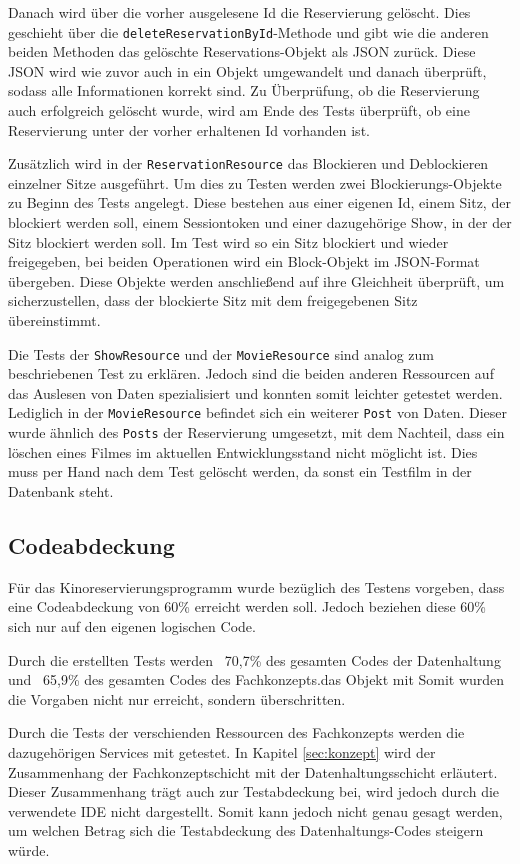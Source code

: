 Danach wird über die vorher ausgelesene Id die Reservierung gelöscht. Dies geschieht über die \texttt{deleteReservationById}-Methode und gibt wie die anderen beiden Methoden das gelöschte Reservations-Objekt als \acs{JSON} zurück.
Diese \acs{JSON} wird wie zuvor auch in ein Objekt umgewandelt und danach überprüft, sodass alle Informationen korrekt sind. 
Zu Überprüfung, ob die Reservierung auch erfolgreich gelöscht wurde, wird am Ende des Tests überprüft, ob eine Reservierung unter der vorher erhaltenen Id vorhanden ist. 

Zusätzlich wird in der \texttt{ReservationResource} das Blockieren und Deblockieren einzelner Sitze ausgeführt. Um dies zu Testen werden zwei Blockierungs-Objekte zu Beginn des Tests angelegt.
Diese bestehen aus einer eigenen Id, einem Sitz, der blockiert werden soll, einem Sessiontoken und einer dazugehörige Show, in der der Sitz blockiert werden soll. 
Im Test wird so ein Sitz blockiert und wieder freigegeben, bei beiden Operationen wird ein Block-Objekt im \acs{JSON}-Format übergeben. 
Diese Objekte werden anschließend auf ihre Gleichheit überprüft, um sicherzustellen, dass der blockierte Sitz mit dem freigegebenen Sitz übereinstimmt.

Die Tests der \texttt{ShowResource} und der \texttt{MovieResource} sind analog zum beschriebenen Test zu erklären. 
Jedoch sind die beiden anderen Ressourcen auf das Auslesen von Daten spezialisiert und konnten somit leichter getestet werden. 
Lediglich in der \texttt{MovieResource} befindet sich ein weiterer \texttt{Post} von Daten. 
Dieser wurde ähnlich des \texttt{Posts} der Reservierung umgesetzt, mit dem Nachteil, dass ein löschen eines Filmes im aktuellen Entwicklungsstand nicht möglicht ist. Dies muss per Hand nach dem Test gelöscht werden, da sonst ein Testfilm in der Datenbank steht.

\subsection{Codeabdeckung} 
\label{sec:codeabdeckung}
Für das Kinoreservierungsprogramm wurde bezüglich des Testens vorgeben, dass eine Codeabdeckung von 60\% erreicht werden soll.
Jedoch beziehen diese 60\% sich nur auf den eigenen logischen Code. 

Durch die erstellten Tests werden ~70,7\% des gesamten Codes der Datenhaltung und ~65,9\% des gesamten Codes des Fachkonzepts.das Objekt mit 
Somit wurden die Vorgaben nicht nur erreicht, sondern überschritten.

Durch die Tests der verschienden Ressourcen des Fachkonzepts werden die dazugehörigen Services mit getestet.
In Kapitel \vref{sec:konzept} wird der Zusammenhang der Fachkonzeptschicht mit der Datenhaltungsschicht erläutert. 
Dieser Zusammenhang trägt auch zur Testabdeckung bei, wird jedoch durch die verwendete \acs{IDE} nicht dargestellt.
Somit kann jedoch nicht genau gesagt werden, um welchen Betrag sich die Testabdeckung des Datenhaltungs-Codes steigern würde.